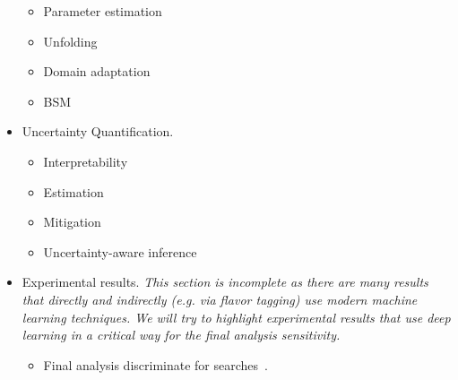 \documentclass[12pt,letterpaper]{article}
\begin{document}
\begin{itemize}
\begin{itemize}
		\item Parameter estimation~\cite{Andreassen:2019nnm,Stoye:2018ovl,Hollingsworth:2020kjg,Brehmer:2018kdj,Brehmer:2018eca,Brehmer:2019xox,Brehmer:2018hga,Cranmer:2015bka}
		\item Unfolding~\cite{Andreassen:2019cjw,Datta:2018mwd,Bellagente:2019uyp,Gagunashvili:2010zw,Glazov:2017vni,Martschei:2012pr,Lindemann:1995ut,Zech2003BinningFreeUB,1800956}
		\item Domain adaptation~\cite{Rogozhnikov:2016bdp,Andreassen:2019nnm,Cranmer:2015bka}
		\item BSM~\cite{Andreassen:2020nkr,Hollingsworth:2020kjg,Brehmer:2018kdj,Brehmer:2018eca,Brehmer:2018hga,Brehmer:2019xox,Romao:2020ojy}
	\end{itemize}
\item Uncertainty Quantification.
	\begin{itemize}
		\item Interpretability~\cite{deOliveira:2015xxd,Chang:2017kvc,Diefenbacher:2019ezd}
		\item Estimation~\cite{Nachman:2019dol,Nachman:2019yfl,Barnard:2016qma}
		\item Mitigation~\cite{Estrade:DLPS2017,Englert:2018cfo,Louppe:2016ylz}
		\item Uncertainty-aware inference~\cite{Caron:2019xkx,Bollweg:2019skg,deCastro:2018mgh,Wunsch:2020iuh}
	\end{itemize}
\item Experimental results. \textit{This section is incomplete as there are many results that directly and indirectly (e.g. via flavor tagging) use modern machine learning techniques.  We will try to highlight experimental results that use deep learning in a critical way for the final analysis sensitivity.}
	\begin{itemize}
		\item Final analysis discriminate for searches~\cite{Aad:2019yxi,Aad:2020hzm,collaboration2020dijet}.
	\end{itemize}


\end{itemize}


\clearpage
\flushbottom
%


\end{document}
